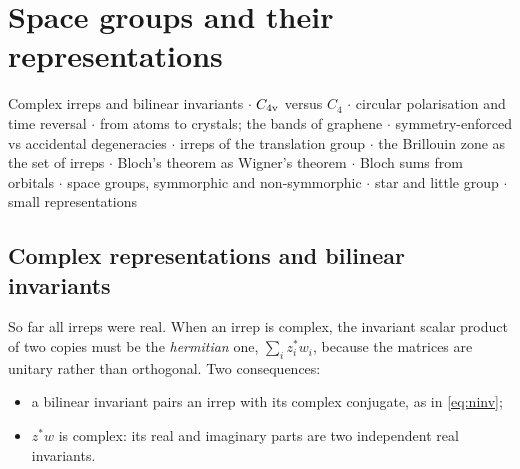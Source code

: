 \chapter{Space groups and their representations}\label{ch:space}

\begin{watch}{}
Complex irreps and bilinear invariants  $\cdot$
$C_{4\mathrm{v}}$ versus $C_4$  $\cdot$
circular polarisation and time reversal  $\cdot$
from atoms to crystals; the bands of graphene  $\cdot$
symmetry-enforced vs accidental degeneracies  $\cdot$
irreps of the translation group  $\cdot$
the Brillouin zone as the set of irreps  $\cdot$
Bloch's theorem as Wigner's theorem  $\cdot$
Bloch sums from orbitals  $\cdot$
space groups, symmorphic and non-symmorphic  $\cdot$
star and little group  $\cdot$
small representations 
\end{watch}

\section{Complex representations and bilinear invariants}\label{sec:complexinv}

So far all irreps were real. When an irrep is complex, the invariant scalar product
of two copies must be the \emph{hermitian} one, $\sum_iz_i^{*}w_i$, because the matrices
are unitary rather than orthogonal. Two consequences:
\begin{itemize}
\item a bilinear invariant pairs an irrep with its complex conjugate, as in
      \eqref{eq:ninv};
\item $z^{*}w$ is complex: its real and imaginary parts are two independent real
      invariants.
\end{itemize}

